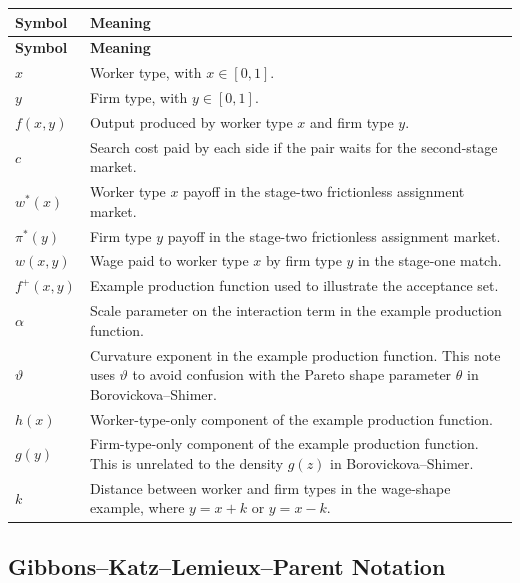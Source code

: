 \documentclass[11pt]{article}
\newcommand{\1}{\mathbf{1}}
\begin{document}
\begin{longtable}{p{}p{}}
\toprule
\textbf{Symbol} & \textbf{Meaning} \\
\midrule
\endfirsthead
\toprule
\textbf{Symbol} & \textbf{Meaning} \\
\midrule
\endhead
\bottomrule
\endfoot
$x$ & Worker type, with $x\in[0,1]$. \\
$y$ & Firm type, with $y\in[0,1]$. \\
$f(x,y)$ & Output produced by worker type $x$ and firm type $y$. \\
$c$ & Search cost paid by each side if the pair waits for the second-stage market. \\
$w^*(x)$ & Worker type $x$ payoff in the stage-two frictionless assignment market. \\
$\pi^*(y)$ & Firm type $y$ payoff in the stage-two frictionless assignment market. \\
$w(x,y)$ & Wage paid to worker type $x$ by firm type $y$ in the stage-one match. \\
$f^+(x,y)$ & Example production function used to illustrate the acceptance set. \\
$\alpha$ & Scale parameter on the interaction term in the example production function. \\
$\vartheta$ & Curvature exponent in the example production function. This note uses $\vartheta$ to avoid confusion with the Pareto shape parameter $\theta$ in Borovickova--Shimer. \\
$h(x)$ & Worker-type-only component of the example production function. \\
$g(y)$ & Firm-type-only component of the example production function. This is unrelated to the density $g(z)$ in Borovickova--Shimer. \\
$k$ & Distance between worker and firm types in the wage-shape example, where $y=x+k$ or $y=x-k$. \\
\end{longtable}

\subsection*{Gibbons--Katz--Lemieux--Parent Notation}
\end{document}
